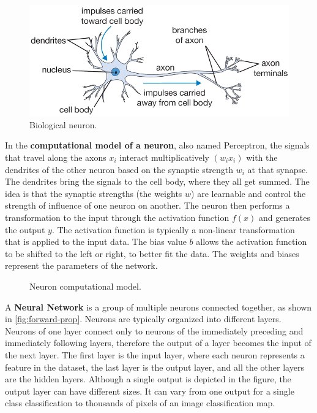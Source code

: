\begin{figure}[h]
	\centering
	\includegraphics[width=0.7\linewidth]{images/approaches/deep_learning/neuron_b.png}
	\caption[footnote-3d]{Biological neuron.\footnotemark}
	\label{fig:neuron-bio}
\end{figure}

In the \textbf{computational model of a neuron}, also named Perceptron, the signals that travel along the axons $x_i$ interact multiplicatively $(w_ix_i)$ with the dendrites of the other neuron based on the synaptic strength $w_i$ at that synapse.
The dendrites bring the signals to the cell body, where they all get summed. The idea is that the synaptic strengths (the weights $w$) are learnable and control the strength of influence of one neuron on another. 
The neuron then performs a transformation to the input through the activation function $f(x)$ and generates the output $y$.
The activation function is typically a non-linear transformation that is applied to the input data.
The bias value $b$ allows the activation function to be shifted to the left or right, to better fit the data.
The weights and biases represent the parameters of the network.

\begin{figure}[htbp]
  \centering
  
  \caption{Neuron computational model.}
  \label{fig:neuron-comp}
\end{figure}

A \textbf{Neural Network} is a group of multiple neurons connected together, as shown in \autoref{fig:forward-prop}.
Neurons are typically organized into different layers.
Neurons of one layer connect only to neurons of the immediately preceding and immediately following layers, therefore the output of a layer becomes the input of the next layer.
The first layer is the input layer, where each neuron represents a feature in the dataset, the last layer is the output layer, and all the other layers are the hidden layers.
Although a single output is depicted in the figure, the output layer can have different sizes. It can vary from one output for a single class classification to thousands of pixels of an image classification map.

